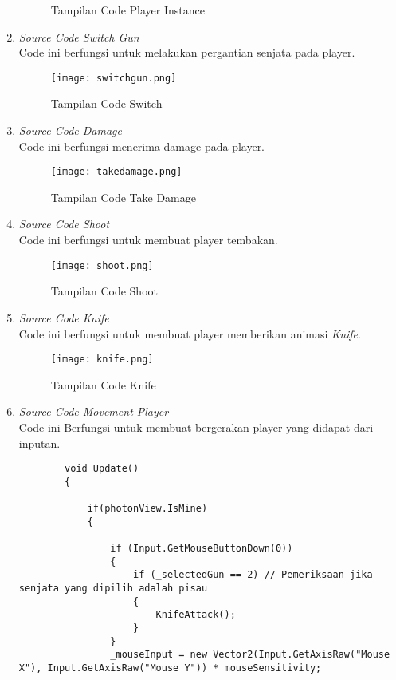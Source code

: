 \begin{enumerate}
\begin{figure}[h]
        \caption{Tampilan Code Player Instance}
        \label{fig:playerinstance}
    \end{figure}
    \item \textit{Source Code Switch Gun} \\ 
    Code ini berfungsi untuk melakukan pergantian senjata pada player.
    \begin{figure}[h]
        \centering
        \texttt{[image: switchgun.png]}
        \caption{Tampilan Code Switch}
        \label{fig:switchgun}
    \end{figure}
    \item \textit{Source Code Damage} \\
    Code ini berfungsi menerima damage pada player.
    \newpage
    \begin{figure}[h]
        \centering
        \texttt{[image: takedamage.png]}
        \caption{Tampilan Code Take Damage}
        \label{fig:takedamage}
    \end{figure}
    \item \textit{Source Code Shoot} \\ 
    Code ini berfungsi untuk membuat player tembakan.
    \begin{figure}[h]
        \centering
        \texttt{[image: shoot.png]}
        \caption{Tampilan Code Shoot}
        \label{fig:shoot}
    \end{figure}
    \item \textit{Source Code Knife} \\ 
    Code ini berfungsi untuk membuat player memberikan animasi \textit{Knife}.
    \newpage
    \begin{figure}[h]
        \centering
        \texttt{[image: knife.png]}
        \caption{Tampilan Code Knife}
        \label{fig:knife}
    \end{figure}
    \item \textit{Source Code Movement Player} \\ 
    Code ini Berfungsi untuk membuat bergerakan player yang didapat dari inputan.
    \begin{lstlisting}
        void Update()
        {
    
            if(photonView.IsMine)
            {
    
                if (Input.GetMouseButtonDown(0))
                {
                    if (_selectedGun == 2) // Pemeriksaan jika senjata yang dipilih adalah pisau
                    {
                        KnifeAttack();
                    }
                }
                _mouseInput = new Vector2(Input.GetAxisRaw("Mouse X"), Input.GetAxisRaw("Mouse Y")) * mouseSensitivity;
    

\end{lstlisting}
\end{enumerate}
